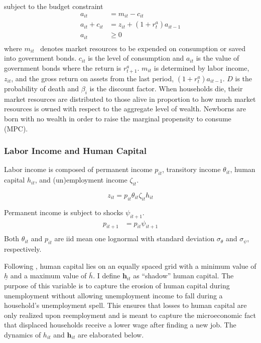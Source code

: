 subject to the budget constraint 
\begin{align*}
a_{it}     &= m_{it} - c_{it}    \\
a_{it} +c_{it}    &= z_{it} +   (1 + r^{a}_{t} ) a_{it-1} \\ 
a_{it}  &\geq 0 \\
\end{align*}
where $m_{it}$ \ denotes market resources to be expended on consumption or saved into government bonds. $c_{it}$ is the level of consumption and $ a_{it}$ is the value of government bonds where the return is $r_{t+1}^{a}$.  $m_{it}$ is determined by labor income,  $z_{it}$, and the gross return on assets from the last period, $(1+r_{t}^{a}) a_{it-1} $. $D$ is the probability of death and $\beta_{i}$ is the discount factor. When households die, their market resources are distributed to those alive in proportion to how much market resources is owned with respect to the aggregate level of wealth. Newborns are born with no wealth in order to raise the marginal propensity to consume (MPC).  



\subsubsection{Labor Income and Human Capital}
\label{subsec:Labor Income and Human Capital}
Labor income is composed of permanent income $p_{it}$, transitory income $\theta_{it}$, human capital $h_{it}$, and (un)employment income $\zeta_{it}$.


$$z_{it} = p_{it}\theta_{it}\zeta_{it} h_{it}$$ 

Permanent income is subject to shocks $\psi_{it+1}$.
\begin{align*}
p_{it+1} &=p_{it} \psi_{it+1} \\
\end{align*}
Both $\theta_{it}$ and $p_{it}$  are iid mean one lognormal with standard deviation $\sigma_{\theta}$ and $\sigma_\psi$, respectively.


Following \cite{Birinci2021}, human capital lies on an equally spaced grid with a minimum value of $\underline{h}$ and a maximum value of $\bar{h}$. I define $\mathbf{h}_{it}$ as ``shadow'' human capital. The purpose of this variable is to capture the erosion of human capital during unemployment without allowing unemployment income to fall during a household's unemployment spell. This ensures that losses to human capital are only realized upon reemployment and is meant to capture the microeconomic fact that displaced households receive a lower wage after finding a new job. The dynamics of $h_{it}$ and $\mathbf{h}_{it}$ are elaborated below.
    

